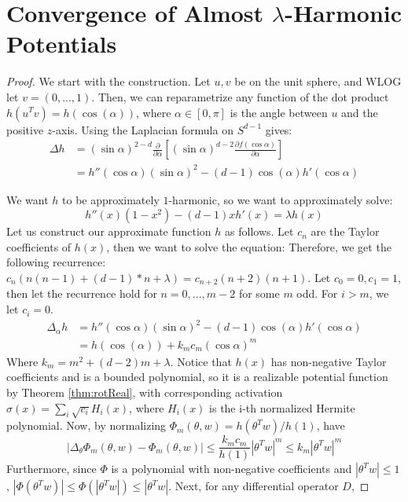 

\section{Convergence of Almost $\lambda$-Harmonic Potentials}\label{App:EigenFunc}

\almostHarmonic*

\begin{proof}
We start with the construction. Let $u,v$ be on the unit sphere, and WLOG let $v = (0,...,1)$. Then, we can reparametrize any function of the dot product $h(u^Tv) = h(\cos(\alpha))$, where $\alpha \in [0, \pi]$ is the angle between $u$ and the positive $z$-axis.
Using the Laplacian formula on $S^{d-1}$ gives: \cite{Laplacian}
\begin{align*}
\Delta h & = (\sin \alpha)^{2-d} \frac{\partial}{\partial \alpha}\left[ (\sin \alpha)^{d-2} \frac{\partial f(\cos \alpha)}{\partial \alpha}\right] \\
& = h''(\cos\alpha)(\sin \alpha)^{2} - (d-1)\cos(\alpha)h'(\cos\alpha)
\end{align*}


We want $h$ to be approximately $1$-harmonic, so we want to approximately solve:
%
\[h''(x)(1-x^2) - (d-1)xh'(x) =  \lambda h(x) \]
%
Let us construct our approximate function $h$ as follows. Let $c_n$ are the Taylor coefficients of $h(x)$, then we want to solve the equation:
Therefore, we get the following recurrence: $c_n (n(n-1) + (d-1)*n + \lambda) = c_{n+2} (n+2)(n+1)$. Let $c_0 = 0, c_1 = 1$, then let the recurrence hold for $n=0,...,m-2$ for some $m$ odd. For $i > m$, we let $c_i = 0$. 
\begin{align*}
\Delta_\alpha h & = h''(\cos\alpha)(\sin \alpha)^{2} - (d-1)\cos(\alpha)h'(\cos\alpha) \\
&= h(\cos(\alpha)) + k_mc_m(\cos\alpha)^m
\end{align*}
Where $k_m = m^2 + (d-2)m + \lambda$. Notice that $h(x)$ has non-negative
Taylor coefficients and is a bounded polynomial, so it is a
realizable potential function by Theorem \ref{thm:rotReal}, with
corresponding activation $\sigma(x) = \sum_{i} \sqrt{c_i} H_i(x)$, where $H_i(x)$
is the i-th normalized Hermite polynomial. Now, by normalizing
$\Phi_m(\theta, w) = h(\theta^Tw)/h(1)$, have
%
\[|\Delta_\theta \Phi_m(\theta ,w) - \Phi_m(\theta,w) | \leq \frac{k_mc_m}{h(1)} |\theta^Tw|^m \leq k_m|\theta^Tw|^m\]
Furthermore, since $\Phi$ is a polynomial with non-negative coefficients and $|\theta^Tw|\leq 1$, $|\Phi(\theta^Tw)| \leq \Phi(|\theta^Tw|) \leq |\theta^Tw|$. Next, for any differential operator $D$, 


\end{proof}
